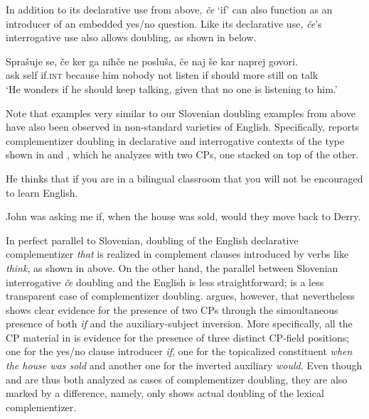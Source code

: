 \documentclass[output=paper,
]{langscibook}
\begin{document}
\noindent In addition to its declarative use from above, \textit{če} `if' can also function as an introducer of an embedded yes/no question. Like its declarative use, \textit{če}’s interrogative use also allows doubling, as shown in  below.

\begin{exe} 
\ex \label{ex:plesnicar:twentynine}
\gll Sprašuje se,	če	ker	ga	nihče		ne	posluša,	če	naj		še	kar	naprej	govori. \\
   ask  self 	if.\textsc{int} because him nobody	not	listen if should more	still	on	talk\\
\trans `He wonders if he should keep talking, given that no one is listening to him.'
\end{exe}

\noindent Note that examples very similar to our Slovenian doubling examples from above have also been observed in non-standard varieties of English. Specifically, \cite{mccloskey2006}  reports complementizer doubling in declarative and interrogative contexts of the type shown in  and , which he analyzes with two CPs, one stacked on top of the other. 

\ea \label{ex:plesnicar:thirty}
He thinks that if you are in a bilingual classroom that you will not be encouraged to learn English.
\hfill\citep[23,~(69b)]{mccloskey2006}
\z

\ea \label{ex:plesnicar:thirtyone}
John was asking me if, when the house was sold, would they move back to Derry.
\hfill\citep[24,~(72c)]{mccloskey2006}
\z

\noindent In perfect parallel to Slovenian, doubling of the English declarative complementizer \textit{that} is realized in complement clauses introduced by verbs like \textit{think}, as shown in  above. On the other hand, the parallel between Slovenian interrogative \textit{če} doubling and the English  is less straightforward;  is a less transparent case of complementizer doubling. \cite{mccloskey2006} argues, however,  that  nevertheless shows clear evidence for the presence of two CPs through the simoultaneous presence of both \textit{if} and the auxiliary-subject inversion. More specifically, all the CP material in  is evidence for the presence of three distinct CP-field positions; one for the yes/no clause introducer \textit{if}, one for the topicalized constituent \textit{when the house was sold} and another one for the inverted auxiliary \textit{would}. Even though  and  are thus both analyzed as cases of complementizer doubling, they are also marked by a difference, namely, only  shows actual doubling of the lexical complementizer.
\end{document}
